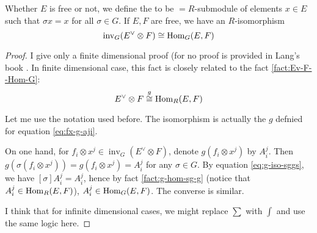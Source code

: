 Whether $E$ is free or not, we define the  to be $=
R$-submodule of elements $x\in E$ such that $\sigma x=x$ for all
$\sigma\in G$. If $E,F$ are free, we have an $R$-isomorphism
\begin{equation}
    \operatorname{inv}_G (E^\vee\otimes F) \cong \operatorname{Hom}_G(E,F)
\end{equation}
\begin{proof}
    I give only a finite dimensional proof (for no proof is provided
    in Lang's book \cite{lang-algebra}. In finite dimensional case,
    this fact is closely related to the fact \ref{fact:Ev-F--Hom-G}:
    \begin{equation*}
        E^\vee \otimes F \overset{g}{\cong} \operatorname{Hom}_R(E,F)
    \end{equation*}

    Let me use the notation used before. The isomorphism is actually
    the $g$ defnied for equation \ref{eq:fx-g-aji}.

    On one hand, for $f_i\otimes x^j \in \operatorname{inv}_G
    (E^\vee\otimes F)$, denote $g(f_i\otimes x^j)$ by $A^j_i$. Then
    $g(\sigma (f_i\otimes x^j)) = g(f_i\otimes x^j) = A^j_i$ for any
    $\sigma\in G$. By equation \ref{eq:g-iso-sggs}, we have
    $[\sigma]A^j_i = A^j_i$, hence by fact \ref{fact:g-hom-sg-g}
    (notice that $A^j_i\in \operatorname{Hom}_R(E,F)$), $A^j_i\in \operatorname{Hom}_G(E,F)$.  The
    converse is similar.

    I think that for infinite dimensional cases, we might replace
    $\sum$ with $\int$ and use the same logic here.
\end{proof}

